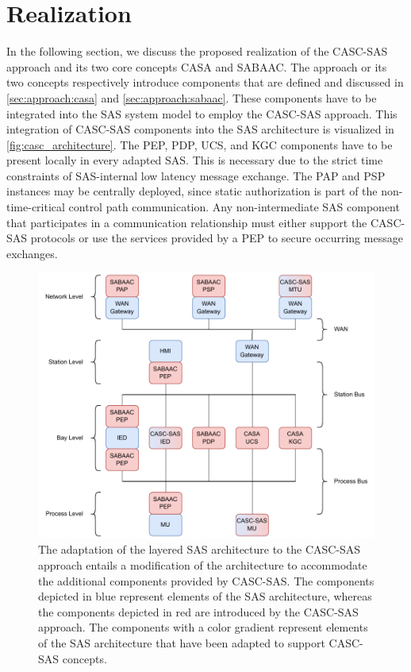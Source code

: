 \section{Realization}
\label{sec:approach:realization}
In the following section, we discuss the proposed realization of the CASC-SAS approach and its two core concepts CASA and SABAAC.
The approach or its two concepts respectively introduce components that are defined and discussed in \autoref{sec:approach:casa} and \autoref{sec:approach:sabaac}.
These components have to be integrated into the SAS system model to employ the CASC-SAS approach.
This integration of CASC-SAS components into the SAS architecture is visualized in \autoref{fig:casc_architecture}.
The PEP, PDP, UCS, and KGC components have to be present locally in every adapted SAS.
This is necessary due to the strict time constraints of SAS-internal low latency message exchange.
The PAP and PSP instances may be centrally deployed, since static authorization is part of the non-time-critical control path communication.
Any non-intermediate SAS component that participates in a communication relationship must either support the CASC-SAS protocols or use the services provided by a PEP to secure occurring message exchanges.
\begin{figure}
    \centering
    \includegraphics[width=1.0\linewidth]{figures/casc_architecture_color.drawio.pdf}
    \caption{The adaptation of the layered SAS architecture to the CASC-SAS approach entails a modification of the architecture to accommodate the additional components provided by CASC-SAS. The components depicted in blue represent elements of the SAS architecture, whereas the components depicted in red are introduced by the CASC-SAS approach. The components with a color gradient represent elements of the SAS architecture that have been adapted to support CASC-SAS concepts.}
    \label{fig:casc_architecture}
\end{figure}

